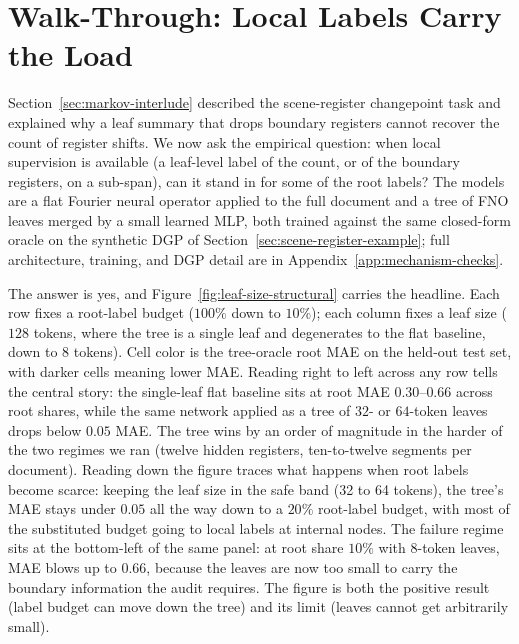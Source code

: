 \section{Walk-Through: Local Labels Carry the Load}\label{sec:markov-walkthrough}

Section~\ref{sec:markov-interlude} described the scene-register
changepoint task and explained why a leaf summary that drops boundary
registers cannot recover the count of register shifts. We now ask the
empirical question: when local supervision is available (a leaf-level
label of the count, or of the boundary registers, on a sub-span), can
it stand in for some of the root labels? The models are a flat Fourier neural operator applied to
the full document and a tree of FNO leaves merged by a small learned
MLP, both trained against the same closed-form oracle on the synthetic
DGP of Section~\ref{sec:scene-register-example}; full architecture,
training, and DGP detail are in Appendix~\ref{app:mechanism-checks}.

The answer is yes, and Figure~\ref{fig:leaf-size-structural} carries
the headline. Each row fixes a root-label budget ($100\%$ down to
$10\%$); each column fixes a leaf size ($128$ tokens, where the tree
is a single leaf and degenerates to the flat baseline, down to $8$
tokens). Cell color is the tree-oracle root MAE on the held-out test
set, with darker cells meaning lower MAE. Reading right to left
across any row tells the central story: the single-leaf flat baseline
sits at root MAE $0.30$--$0.66$ across root shares, while the same
network applied as a tree of $32$- or $64$-token leaves drops below
$0.05$ MAE. The tree wins by an order of magnitude in the harder of
the two regimes we ran (twelve hidden registers, ten-to-twelve
segments per document). Reading down the figure traces what happens
when root labels become scarce: keeping the leaf size in the safe
band (32 to 64 tokens), the tree's MAE stays under $0.05$ all the way
down to a $20\%$ root-label budget, with most of the substituted
budget going to local labels at internal nodes. The failure regime
sits at the bottom-left of the same panel: at root share $10\%$ with
$8$-token leaves, MAE blows up to $0.66$, because the leaves are now
too small to carry the boundary information the audit requires. The
figure is both the positive result (label budget can move down the
tree) and its limit (leaves cannot get arbitrarily small).

